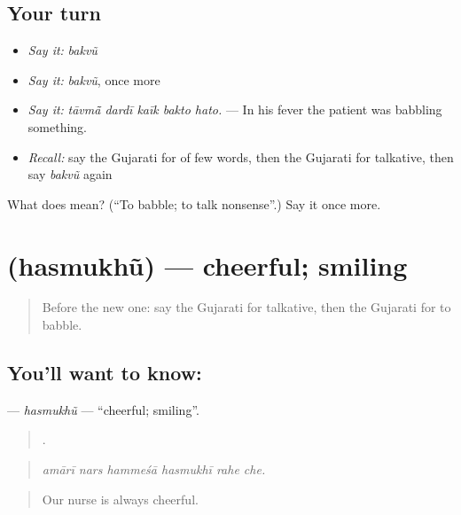 \subsection*{Your turn}
\begin{itemize}
\raggedright
  \item \emph{Say it:} \emph{bakvũ}
  \item \emph{Say it:} \emph{bakvũ}, once more
  \item \emph{Say it:} \emph{tāvmā̃ dardī kaīk bakto hato.} — In his fever the patient was babbling something.
  \item \emph{Recall:} say the Gujarati for of few words, then the Gujarati for talkative, then say \emph{bakvũ} again
\end{itemize}

\begin{tcolorbox}[breakable,colback=teal!4,colframe=teal!35!black,title={Before you move on}]
What does  mean? (\textquotedblleft{}To babble; to talk nonsense\textquotedblright{}.) Say it once more.
\end{tcolorbox}
\section[\texorpdfstring{\gu{હસમુખું} (hasmukhũ)}{હસમુખું (hasmukhũ)}]{ (hasmukhũ) — cheerful; smiling}

\label{lesson:GU-C463-hasmukhu}



\begin{quote}
Before the new one: say the Gujarati for talkative, then the Gujarati for to babble.
\end{quote}

\subsection*{You'll want to know: }
\textbf{} — \emph{hasmukhũ} — \textquotedblleft{}cheerful; smiling\textquotedblright{}.

\begin{quote}
     .
\end{quote}

\begin{quote}
\emph{amārī nars hammeśā hasmukhī rahe che.}
\end{quote}

\begin{quote}
Our nurse is always cheerful.
\end{quote}


